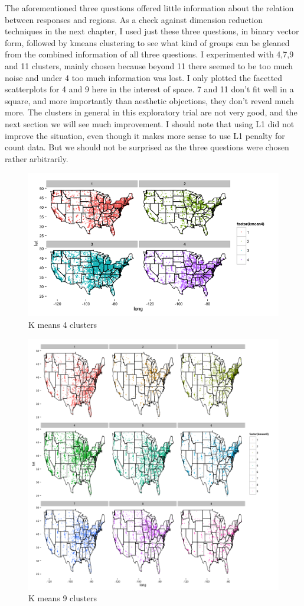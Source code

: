 \documentclass{article}\usepackage[]{graphicx}\usepackage[]{color}
\begin{document}
The aforementioned three questions offered little information about the relation between responses and regions.  As a check against dimension reduction techniques in the next chapter, I used just these three questions, in binary vector form, followed by kmeans clustering to see what kind of groups can be gleaned from the combined information of all three questions.  I experimented with 4,7,9 and 11 clusters, mainly chosen because beyond 11 there seemed to be too much noise and under 4 too much information was lost. I only plotted the facetted scatterplots for 4 and 9 here in the interest of space.  7 and 11 don't fit well in a square, and more importantly than aesthetic objections, they don't reveal much more.  The clusters in general in this exploratory trial are not very good, and the next section we will see much improvement.  I should note that using L1 did not improve the situation, even though it makes more sense to use L1 penalty for count data.  But we should not be surprised as the three questions were chosen rather arbitrarily.

\begin{figure}[H]
\centering
\includegraphics[width=300pts, height=180pts]{kmean4_dumb.png}
\caption{K means 4 clusters}
\end{figure}

\begin{figure}[H]
\centering
\includegraphics[width=400pts, height=240pts]{kmean9_dumb.png}
\caption{K means 9 clusters}
\end{figure}
\end{document}
